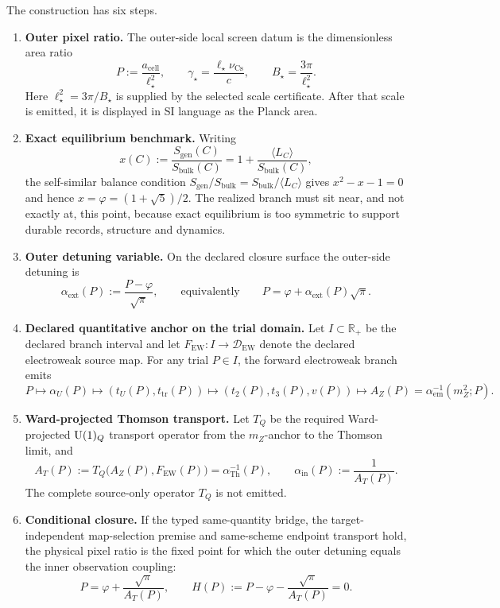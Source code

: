 The construction has six steps.
\begin{enumerate}[leftmargin=2em]
\item \textbf{Outer pixel ratio.} The outer-side local screen datum is the dimensionless area
ratio
\[
P:=\frac{a_{\mathrm{cell}}}{\ell_\star^2},
\qquad
\gamma_\star=\frac{\ell_\star\nu_{\mathrm{Cs}}}{c},
\qquad
B_\star=\frac{3\pi}{\ell_\star^2}.
\]
Here \(\ell_\star^2=3\pi/B_\star\) is supplied by the selected scale certificate. After that scale
is emitted, it is displayed in SI language as the Planck area.
\item \textbf{Exact equilibrium benchmark.} Writing
\[
x(C):=\frac{S_{\mathrm{gen}}(C)}{S_{\mathrm{bulk}}(C)}
=
1+\frac{\langle L_C\rangle}{S_{\mathrm{bulk}}(C)},
\]
the self-similar balance condition
\(S_{\mathrm{gen}}/S_{\mathrm{bulk}}=S_{\mathrm{bulk}}/\langle L_C\rangle\)
gives \(x^2-x-1=0\) and hence \(x=\varphi=(1+\sqrt5)/2\). The realized branch
must sit near, and not exactly at, this point, because exact equilibrium is
too symmetric to support durable records, structure and dynamics.
\item \textbf{Outer detuning variable.} On the declared closure surface the
outer-side detuning is
\[
\alpha_{\mathrm{ext}}(P):=\frac{P-\varphi}{\sqrt{\pi}},
\qquad\text{equivalently}\qquad
P=\varphi+\alpha_{\mathrm{ext}}(P)\sqrt{\pi}.
\]
\item \textbf{Declared quantitative anchor on the trial domain.} Let \(I\subset\mathbb R_+\) be
the declared branch interval and let
\(F_{\mathrm{EW}}:I\to\mathcal D_{\mathrm{EW}}\)
denote the declared electroweak source map. For any trial \(P\in I\), the forward electroweak branch emits
\[
P\longmapsto \alpha_U(P)\longmapsto (t_U(P),t_{\mathrm{tr}}(P))
\longmapsto (t_2(P),t_3(P),v(P))
\longmapsto A_Z(P)=\alpha_{\mathrm{em}}^{-1}(m_Z^2;P).
\]
\item \textbf{Ward-projected Thomson transport.} Let \(T_Q\) be the required Ward-projected
\(\mathrm{U}(1)_Q\) transport operator from the \(m_Z\)-anchor to the Thomson limit, and
\[
A_T(P):=
T_Q\bigl(A_Z(P),F_{\mathrm{EW}}(P)\bigr)
=
\alpha_{\mathrm{Th}}^{-1}(P),
\qquad
\alpha_{\mathrm{in}}(P):=\frac{1}{A_T(P)}.
\]
The complete source-only operator \(T_Q\) is not emitted.
\item \textbf{Conditional closure.} If the typed same-quantity bridge, the
target-independent map-selection premise and same-scheme endpoint transport
hold, the physical pixel ratio is the fixed point for which the outer detuning
equals the inner observation coupling:
\[
\boxed{P=\varphi+\frac{\sqrt\pi}{A_T(P)}},
\qquad
H(P):=P-\varphi-\frac{\sqrt{\pi}}{A_T(P)}=0.
\]
\end{enumerate}

